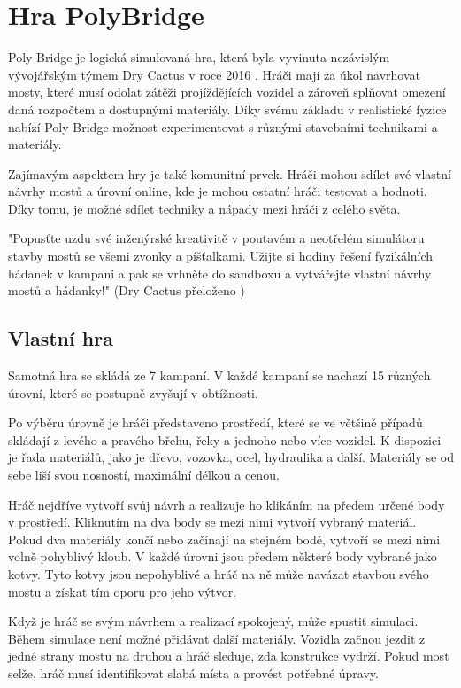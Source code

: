 \chapter{Hra PolyBridge}

Poly Bridge je logická simulovaná hra, která byla vyvinuta nezávislým vývojářským týmem Dry Cactus v roce 2016 \citet{drycactus}. Hráči mají za úkol navrhovat mosty, které musí odolat zátěži projíždějících vozidel a zároveň splňovat omezení daná rozpočtem a dostupnými materiály. Díky svému základu v realistické fyzice nabízí Poly Bridge možnost experimentovat s různými stavebními technikami a materiály.

Zajímavým aspektem hry je také komunitní prvek. Hráči mohou sdílet své vlastní návrhy mostů a úrovní online, kde je mohou ostatní hráči testovat a hodnoti. Díky tomu, je možné sdílet techniky a nápady mezi hráči z celého světa. 

"Popusťte uzdu své inženýrské kreativitě v poutavém a neotřelém simulátoru stavby mostů se všemi zvonky a píšťalkami. Užijte si hodiny řešení fyzikálních hádanek v kampani a pak se vrhněte do sandboxu a vytvářejte vlastní návrhy mostů a hádanky!" (Dry Cactus přeloženo \citet{drycactus})

\section{Vlastní hra}

Samotná hra se skládá ze 7 kampaní. V každé kampaní se nachazí 15 různých úrovní, které se postupně zvyšují v obtížnosti.

Po výběru úrovně je hráči představeno prostředí, které se ve většině případů skládají z levého a pravého břehu, řeky a jednoho nebo více vozidel. K dispozici je řada materiálů, jako je dřevo, vozovka, ocel, hydraulika a další. Materiály se od sebe liší svou nosností, maximální délkou a cenou.

Hráč nejdříve vytvoří svůj návrh a realizuje ho klikáním na předem určené body v prostředí. Kliknutím na dva body se mezi nimi vytvoří vybraný materiál. Pokud dva materiály končí nebo začínají na stejném bodě, vytvoří se mezi nimi volně pohyblivý kloub. V každé úrovni jsou předem některé body vybrané jako kotvy. Tyto kotvy jsou nepohyblivé a hráč na ně může navázat stavbou svého mostu a získat tím oporu pro jeho výtvor.

Když je hráč se svým návrhem a realizací spokojený, může spustit simulaci. Během simulace není možné přidávat další materiály. Vozidla začnou jezdit z jedné strany mostu na druhou a hráč sleduje, zda konstrukce vydrží. Pokud most selže, hráč musí identifikovat slabá místa a provést potřebné úpravy.

